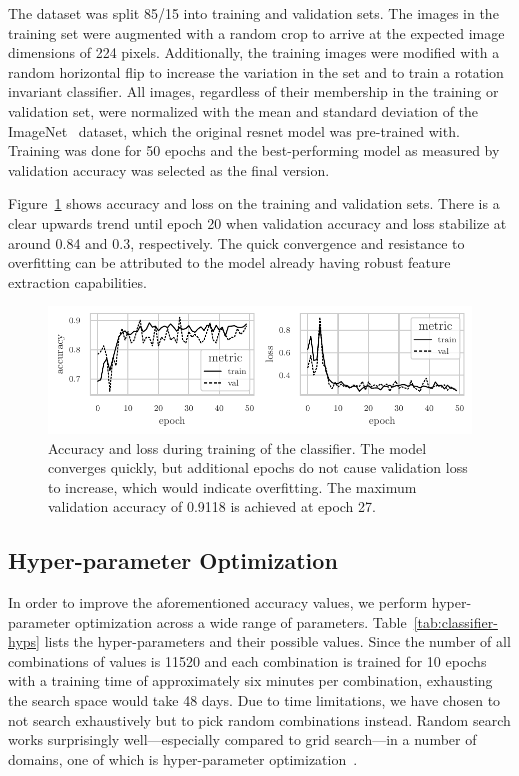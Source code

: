 \documentclass[draft,final]{vutinfth} %
\begin{document}
The dataset was split 85/15 into training and validation sets. The
images in the training set were augmented with a random crop to arrive
at the expected image dimensions of 224 pixels. Additionally, the
training images were modified with a random horizontal flip to
increase the variation in the set and to train a rotation invariant
classifier. All images, regardless of their membership in the training
or validation set, were normalized with the mean and standard
deviation of the ImageNet~\cite{deng2009} dataset, which the original
\gls{resnet} model was pre-trained with. Training was done for 50
epochs and the best-performing model as measured by validation
accuracy was selected as the final version.

Figure~\ref{fig:classifier-training-metrics} shows accuracy and loss
on the training and validation sets. There is a clear upwards trend
until epoch 20 when validation accuracy and loss stabilize at around
0.84 and 0.3, respectively. The quick convergence and resistance to
overfitting can be attributed to the model already having robust
feature extraction capabilities.

\begin{figure}
  \centering
  \includegraphics{graphics/classifier-metrics.pdf}
  \caption[Classifier accuracy and loss during training.]{Accuracy and
    loss during training of the classifier. The model converges
    quickly, but additional epochs do not cause validation loss to
    increase, which would indicate overfitting. The maximum validation
    accuracy of 0.9118 is achieved at epoch 27.}
  \label{fig:classifier-training-metrics}
\end{figure}

\subsection{Hyper-parameter Optimization}
\label{ssec:classifier-hyp-opt}

In order to improve the aforementioned accuracy values, we perform
hyper-parameter optimization across a wide range of
parameters. Table~\ref{tab:classifier-hyps} lists the hyper-parameters
and their possible values. Since the number of all combinations of
values is 11520 and each combination is trained for 10 epochs with a
training time of approximately six minutes per combination, exhausting
the search space would take 48 days. Due to time limitations, we have
chosen to not search exhaustively but to pick random combinations
instead. Random search works surprisingly well---especially compared to
grid search---in a number of domains, one of which is hyper-parameter
optimization~\cite{bergstra2012}.
\end{document}
